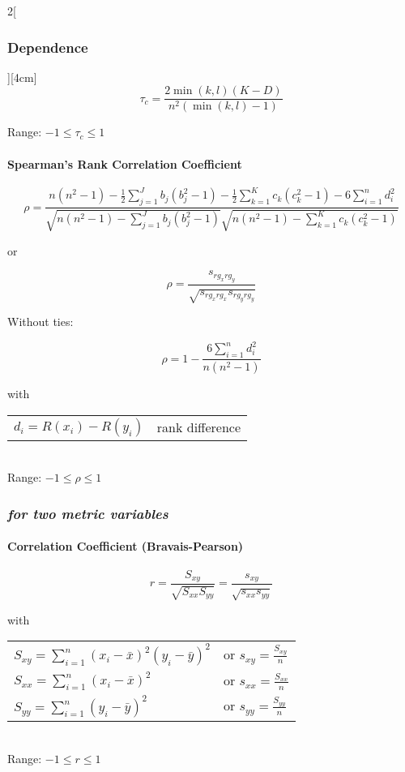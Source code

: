 \documentclass[8pt]{extarticle}
\begin{document}
\begin{multicols}{2}[\subsubsection{Dependence}][4cm]
$$\tau_c=\frac{2\min(k,l)(K-D)}{n^2(\min(k,l)-1)}$$

Range: $-1 \le \tau_c \le 1$

\paragraph{Spearman's Rank Correlation Coefficient}

$$\rho=\frac{n(n^2-1)-\frac{1}{2}\sum\limits_{j=1}^J b_j(b_j^2-1)-\frac{1}{2}\sum\limits_{k=1}^K c_k(c_k^2-1)-6\sum\limits_{i=1}^n d_i^2}{\sqrt{n(n^2-1)-\sum\limits_{j=1}^J b_j(b_j^2-1)}\sqrt{n(n^2-1)-\sum\limits_{k=1}^Kc_k(c_k^2-1)}}$$

or

$$\rho=\frac{s_{rg_xrg_y}}{\sqrt{s_{rg_xrg_x}s_{rg_yrg_y}}}$$

 Without ties:

$$\rho=1-\frac{6\sum\limits_{i=1}^nd_i^2}{n(n^2-1)}$$

with

\begin{tabular}{l l } 
 $d_i=R(x_i)-R(y_i)$ & rank difference \\ 
\end{tabular}

\ \\

Range: $-1 \le \rho \le 1$

\subsubsection*{\textit{for two metric variables}}

\paragraph{Correlation Coefficient (Bravais-Pearson)}

$$r=\frac{S_{xy}}{\sqrt{S_{xx}S_{yy}}}=\frac{s_{xy}}{\sqrt{s_{xx}s_{yy}}}$$

with

\begin{tabular}{l l } 
$S_{xy}=\sum\limits_{i=1}^n(x_i-\bar{x})^2(y_i-\bar{y})^2$ & or $s_{xy}=\frac{S_{xy}}{n}$ \\
$S_{xx}=\sum\limits_{i=1}^n(x_i-\bar{x})^2$ & or $s_{xx}=\frac{S_{xx}}{n}$ \\ 
$S_{yy}=\sum\limits_{i=1}^n(y_i-\bar{y})^2$ & or $s_{yy}=\frac{S_{yy}}{n}$ \\
\end{tabular}

\ \\

Range: $-1 \le r \le 1$




\end{multicols}
\end{document}

